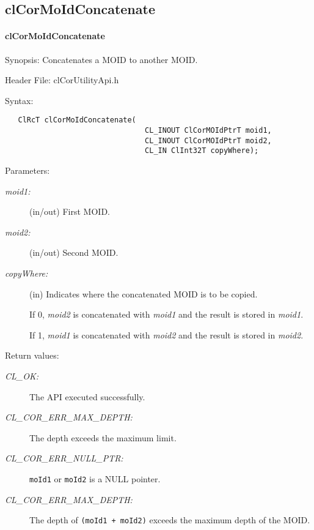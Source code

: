 \begin{flushleft}
\subsection{clCorMoIdConcatenate}
\hypertarget{pagecor132}{}\paragraph{cl\-Cor\-MoId\-Concatenate}\label{pagecor132}
\begin{Desc}
\item[Synopsis:]Concatenates a MOID to another MOID.\end{Desc}
\begin{Desc}
\item[Header File:]clCorUtilityApi.h\end{Desc}
\begin{Desc}
\item[Syntax:]

\footnotesize\begin{verbatim}   ClRcT clCorMoIdConcatenate(
                         		CL_INOUT ClCorMOIdPtrT moid1,
                         		CL_INOUT ClCorMOIdPtrT moid2,
                         		CL_IN ClInt32T copyWhere);
\end{verbatim}
\normalsize
\end{Desc}

\begin{Desc}
\item[Parameters:]

\begin{description}
\item[{\em moid1:}](in/out) First MOID. 
\item[{\em moid2:}](in/out) Second MOID. 
\item[{\em copyWhere:}](in) Indicates where the concatenated MOID is to be copied. 
\par
 If 0, {\em moid2} is concatenated with {\em moid1} and the result is stored in {\em moid1}.
 \par
 If 1, {\em moid1} is concatenated with {\em moid2} and the result is stored in {\em moid2}.
\end{description}

\end{Desc}


\begin{Desc}
\item[Return values:]
\begin{description}
\item[{\em CL\_\-OK:}]The API executed successfully. 
\item[{\em CL\_\-COR\_\-ERR\_\-MAX\_\-DEPTH:}]The depth exceeds the maximum limit.
\item[{\em CL\_\-COR\_\-ERR\_\-NULL\_\-PTR:}] {\tt{moId1}} or {\tt{moId2}} is a NULL pointer.
\item[{\em CL\_\-COR\_\-ERR\_\-MAX\_\-DEPTH:}] The depth of {\tt{(moId1 + moId2)}} exceeds the maximum depth of the MOID.



\end{description}
\end{Desc}
\end{flushleft}
